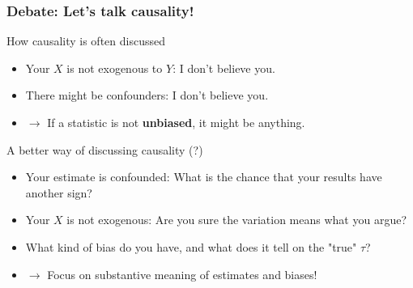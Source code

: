 \documentclass[12pt,aspectratio=169]{beamer}\usepackage[]{graphicx}\usepackage[]{xcolor}
\begin{document}
\begin{frame}
\frametitle{Debate: Let's talk causality!}

    \begin{alertblock}{How causality is often discussed}

    \begin{itemize}[itemsep=0em, topsep=0pt]
    \small
        \item Your $X$ is not exogenous to $Y$: I don't believe you.
        \item There might be confounders: I don't believe you.
        \item $\rightarrow$ If a statistic is not \textbf{unbiased}, it might be anything.
    \end{itemize}

    \end{alertblock}

    \begin{alertblock}{A better way of discussing causality (?)}

    \begin{itemize}[itemsep=0em, topsep=0pt]
    \small
        \item Your estimate is confounded: What is the chance that your results have another sign?
        \item Your $X$ is not exogenous: Are you sure the variation means what you argue?
        \item What kind of bias do you have, and what does it tell on the "true" $\tau$?
        \item $\rightarrow$ Focus on substantive meaning of estimates and biases!
    \end{itemize}

    \end{alertblock}

\end{frame}
\end{document}
